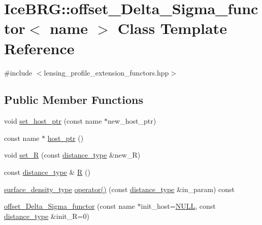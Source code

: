 \hypertarget{classIceBRG_1_1offset__Delta__Sigma__functor}{\section{Ice\-B\-R\-G\-:\-:offset\-\_\-\-Delta\-\_\-\-Sigma\-\_\-functor$<$ name $>$ Class Template Reference}
\label{classIceBRG_1_1offset__Delta__Sigma__functor}
}


{\ttfamily \#include $<$lensing\-\_\-profile\-\_\-extension\-\_\-functors.\-hpp$>$}

\subsection*{Public Member Functions}
\begin{DoxyCompactItemize}
\item 
void \hyperlink{classIceBRG_1_1offset__Delta__Sigma__functor_aa4be0b3f2d504a8e1f99dd20ab87d656}{set\-\_\-host\-\_\-ptr} (const name $\ast$new\-\_\-host\-\_\-ptr)
\item 
const name $\ast$ \hyperlink{classIceBRG_1_1offset__Delta__Sigma__functor_a7179cc58e43c2aa8a5396e9587494f07}{host\-\_\-ptr} ()
\item 
void \hyperlink{classIceBRG_1_1offset__Delta__Sigma__functor_aed929b1761fd7089fcf317ed23f91a08}{set\-\_\-\-R} (const \hyperlink{namespaceIceBRG_a45499647eb87e24c10ab32c628711cec}{distance\-\_\-type} \&new\-\_\-\-R)
\item 
const \hyperlink{namespaceIceBRG_a45499647eb87e24c10ab32c628711cec}{distance\-\_\-type} \& \hyperlink{classIceBRG_1_1offset__Delta__Sigma__functor_a000cbceadda70237df9fd0d50a8c470f}{R} ()
\item 
\hyperlink{namespaceIceBRG_a80c597ef5ba0a32491d32a9f0083b02d}{surface\-\_\-density\-\_\-type} \hyperlink{classIceBRG_1_1offset__Delta__Sigma__functor_a1f55fab2442343aabbeed1905fd82a0c}{operator()} (const \hyperlink{namespaceIceBRG_a45499647eb87e24c10ab32c628711cec}{distance\-\_\-type} \&in\-\_\-param) const 
\item 
\hyperlink{classIceBRG_1_1offset__Delta__Sigma__functor_adf29297b922726aeb9a29754ed367a49}{offset\-\_\-\-Delta\-\_\-\-Sigma\-\_\-functor} (const name $\ast$init\-\_\-host=\hyperlink{lib_2IceBRG__main_2common_8h_a070d2ce7b6bb7e5c05602aa8c308d0c4}{N\-U\-L\-L}, const \hyperlink{namespaceIceBRG_a45499647eb87e24c10ab32c628711cec}{distance\-\_\-type} \&init\-\_\-\-R=0)
\end{DoxyCompactItemize}


